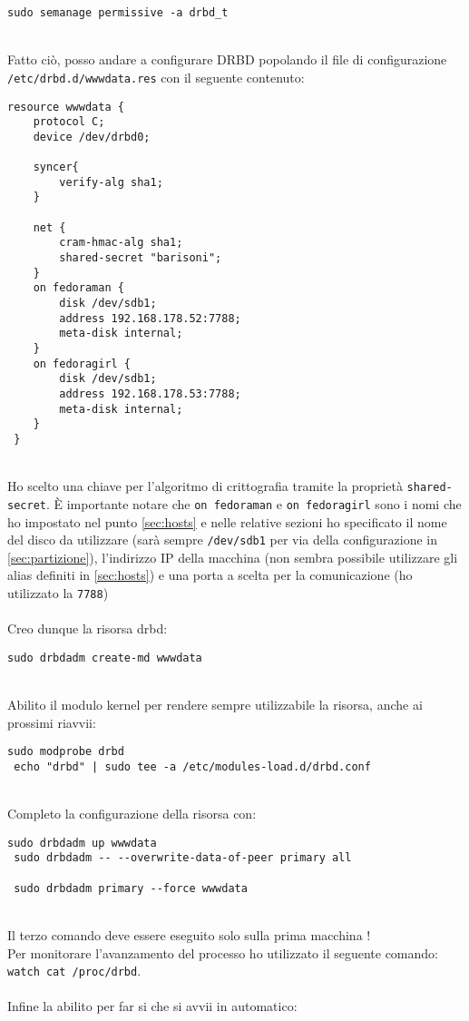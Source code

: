 \begin{lstlisting}[style=cmd]
 sudo semanage permissive -a drbd_t
\end{lstlisting}
\ \\
Fatto ci\`{o}, posso andare a configurare DRBD popolando il file di configurazione \lstinline[style=cmd]|/etc/drbd.d/wwwdata.res| con il seguente contenuto:

\begin{lstlisting}[style=cmd]
 resource wwwdata {
    protocol C;
    device /dev/drbd0;

    syncer{
        verify-alg sha1;
    }

    net {
        cram-hmac-alg sha1;
        shared-secret "barisoni";
    }
    on fedoraman {
        disk /dev/sdb1;
        address 192.168.178.52:7788;
        meta-disk internal;
    }
    on fedoragirl {
        disk /dev/sdb1;
        address 192.168.178.53:7788;
        meta-disk internal;
    }
 }
\end{lstlisting}
\ \\
Ho scelto una chiave per l'algoritmo di crittografia tramite la propriet\`{a} \lstinline[style=cmd]|shared-secret|. \`{E} importante notare che \lstinline[style=cmd]|on fedoraman| e \lstinline[style=cmd]|on fedoragirl| sono i nomi che ho impostato nel punto \autoref{sec:hosts} e nelle relative sezioni ho specificato il nome del disco da utilizzare (sar\`{a} sempre \lstinline[style=cmd]|/dev/sdb1| per via della configurazione in \autoref{sec:partizione}), l'indirizzo IP della macchina (non sembra possibile utilizzare gli alias definiti in \autoref{sec:hosts}) e una porta a scelta per la comunicazione (ho utilizzato la \lstinline[style=cmd]|7788|)\ \\
\ \\
Creo dunque la risorsa drbd:

\begin{lstlisting}[style=cmd]
 sudo drbdadm create-md wwwdata
\end{lstlisting}
\ \\
Abilito il modulo kernel per rendere sempre utilizzabile la risorsa, anche ai prossimi riavvii:

\begin{lstlisting}[style=cmd]
 sudo modprobe drbd
 echo "drbd" | sudo tee -a /etc/modules-load.d/drbd.conf
\end{lstlisting}
\ \\
Completo la configurazione della risorsa con:

\begin{lstlisting}[style=cmd]
 sudo drbdadm up wwwdata
 sudo drbdadm -- --overwrite-data-of-peer primary all
 
 sudo drbdadm primary --force wwwdata
\end{lstlisting}
\ \\
Il terzo comando deve essere eseguito solo sulla prima macchina !\\
Per monitorare l'avanzamento del processo ho utilizzato il seguente comando: \lstinline[style=cmd]|watch cat /proc/drbd|.\\
\ \\
Infine la abilito per far si che si avvii in automatico:

